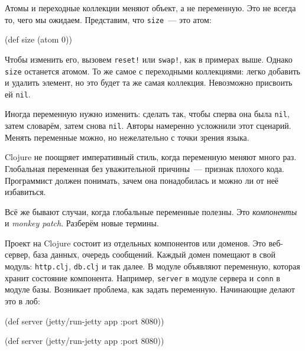Атомы и переходные коллекции меняют объект, а не переменную. Это не всегда то,
чего мы ожидаем. Представим, что \verb|size|~--- это атом:

\begin{english}
  \begin{clojure}
(def size (atom 0))
  \end{clojure}
\end{english}

Чтобы изменить его, вызовем \verb|reset!| или \verb|swap!|, как в примерах
выше. Однако \verb|size| останется атомом. То же самое с переходными
коллекциями: легко добавить и удалить элемент, но это будет та же самая
коллекция. Невозможно присвоить ей \verb|nil|.

Иногда переменную нужно изменить: сделать так, чтобы сперва она была
\verb|nil|, затем словарём, затем снова \verb|nil|. Авторы намеренно
усложнили этот сценарий. Менять переменные можно, но нежелательно с точки зрения
языка.

Clojure не поощряет императивный стиль, когда переменную меняют много
раз. Глобальная переменная без уважительной причины~--- признак плохого кода.
Программист должен понимать, зачем она понадобилась и можно ли от неё
избавиться.


Всё же бывают случаи, когда глобальные переменные полезны. Это \emph{компоненты}
и \emph{monkey patch}. Разберём новые термины.

Проект на Clojure состоит из отдельных компонентов или доменов. Это веб-сервер,
база данных, очередь сообщений. Каждый домен помещают в свой модуль:
\verb|http.clj|, \verb|db.clj| и так далее. В модуле объявляют переменную,
которая хранит состояние компонента. Например, \verb|server| в модуле сервера и
\verb|conn| в модуле базы. Возникает проблема, как задать переменную. Начинающие
делают это в лоб:

\ifx\DEVICETYPE\MOBILE

\begin{english}
  \begin{clojure}
(def server
  (jetty/run-jetty app {:port 8080}))
  \end{clojure}
\end{english}

\else

\begin{english}
  \begin{clojure}
(def server (jetty/run-jetty app {:port 8080}))
  \end{clojure}
\end{english}

